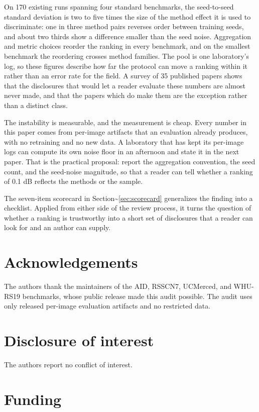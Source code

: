 \documentclass{interact}
\begin{document}
On 170 existing runs spanning four standard benchmarks, the seed-to-seed standard deviation is two to five times the size of the method effect it is used to discriminate: one in three method pairs reverses order between training seeds, and about two thirds show a difference smaller than the seed noise. Aggregation and metric choices reorder the ranking in every benchmark, and on the smallest benchmark the reordering crosses method families. The pool is one laboratory's log, so these figures describe how far the protocol can move a ranking within it rather than an error rate for the field. A survey of 35 published papers shows that the disclosures that would let a reader evaluate these numbers are almost never made, and that the papers which do make them are the exception rather than a distinct class.

The instability is measurable, and the measurement is cheap. Every number in this paper comes from per-image artifacts that an evaluation already produces, with no retraining and no new data. A laboratory that has kept its per-image logs can compute its own noise floor in an afternoon and state it in the next paper. That is the practical proposal: report the aggregation convention, the seed count, and the seed-noise magnitude, so that a reader can tell whether a ranking of 0.1 dB reflects the methods or the sample.

The seven-item scorecard in Section\textasciitilde{}\ref{sec:scorecard} generalizes the finding into a checklist. Applied from either side of the review process, it turns the question of whether a ranking is trustworthy into a short set of disclosures that a reader can look for and an author can supply.

\section*{Acknowledgements}

The authors thank the maintainers of the AID, RSSCN7, UCMerced, and WHU-RS19 benchmarks, whose public release made this audit possible. The audit uses only released per-image evaluation artifacts and no restricted data.

\section*{Disclosure of interest}

The authors report no conflict of interest.

\section*{Funding}
\end{document}
